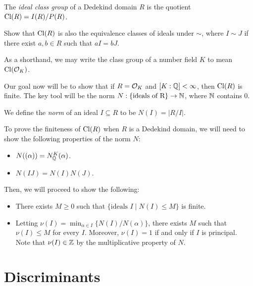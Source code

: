 \begin{definition}
  The \emph{ideal class group} of a Dedekind domain $R$
  is 
  the quotient $\operatorname{Cl}(R) = I(R) / P(R)$.
\end{definition}

\begin{exercise}
  Show that $\operatorname{Cl}(R)$ is also the equivalence classes
  of ideals under $\sim$, where $I \sim J$ if
  there exist $a, b \in R$ such that $aI = bJ$.
\end{exercise}

\begin{remark}
  As a shorthand, we may write the class group of
  a number field $K$ to mean $\operatorname{Cl}(\mathcal{O}_K)$.
\end{remark}

\begin{remark}
  Our goal now will be to show that if $R = \mathcal{O}_K$
  and $[K : \mathbb{Q}] < \infty$, then $\operatorname{Cl}(R)$ is finite.
  The key tool will be the norm
  $N : \{\text{ideals of R}\} \to \mathbb{N}$, where
  $\mathbb{N}$ contains $0$.
\end{remark}

\begin{definition}
  We define the \emph{norm} of an ideal $I \subseteq R$
  to be $N(I) = |R/I|$.
\end{definition}

\begin{remark}
  To prove the finiteness of $\operatorname{Cl}(R)$ when $R$ is a
  Dedekind domain,
  we will need to show the following properties of the
  norm $N$:
  \begin{itemize}
    \item $N((\alpha)) = N^{K}_{\mathbb{Q}}(\alpha)$.
    \item $N(IJ) = N(I) N(J)$.
  \end{itemize}
  Then, we will proceed to show the following:
  \begin{itemize}
    \item There exists $M \ge 0$ such that
      $\{\text{ideals } I \mid N(I) \le M\}$ is finite.
    \item Letting $\nu(I) = \min_{\alpha \in I} \{N(I) / N(\alpha)\}$,
      there exists $M$ such that
      $\nu(I) \le M$ for every $I$.
      Moreover, $\nu(I) = 1$ if and only if
      $I$ is principal.
      Note that
      $\nu(I) \in \mathbb{Z}$ by the multiplicative property
      of $N$.
  \end{itemize}
\end{remark}

\section{Discriminants}

